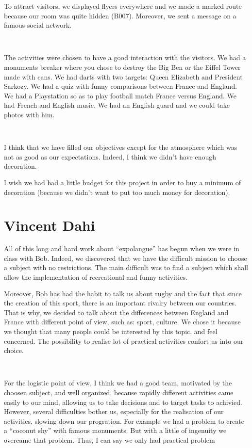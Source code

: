 \documentclass[11pt;a4paper]{report}
\begin{document}
To attract visitors, we displayed flyers everywhere and we made a marked route because our room was quite hidden (B007). Moreover, we sent a message on a famous social network.

~

The activities were chosen to have a good interaction with the visitors. We had a monuments breaker where you chose to destroy the Big Ben or the Eiffel Tower made with cans. We had darts with two targets: Queen Elizabeth and President Sarkozy. We had a quiz with funny comparisons between France and England. We had a Playstation so as to play football match France versus England. We had French and English music. We had an English guard and we could take photos with him. 

~

I think that we have filled our objectives except for the atmosphere which was not as good as our expectations. Indeed, I think we didn’t have enough decoration.

I wish we had had a little budget for this project in order to buy a minimum of decoration (because we didn’t want to put too much money for decoration). 


\newpage
  \section{Vincent Dahi}

    All of this long and hard work about “expolangue” has begun when we were in class with Bob. Indeed, we discovered that we have the difficult mission to choose a subject with no restrictions. The main difficult was to find a subject which shall allow the implementation of recreational and funny activities. 

Moreover, Bob has had the habit to talk us about rugby and the fact that since the creation of this sport, there is an important rivalry between our countries.
That is why, we decided to talk about the differences between England and France with different point of view, such as: sport, culture. We chose it because we thought that many people could be interested by this topic, and feel concerned. The possibility to realise lot of practical activities confort us into our choice.             

~

For the logistic point of view, I think we had a good team, motivated by the choosen subject, and well organized, because rapidly different activities came easily to our mind, allowing us to take decisions and to target tasks to achivied.
However, several difficulties bother us, especially for the realisation of our activities, slowing down our progration. For example we had a problem to create a “coconut shy” with famous monuments. But with a little of ingenuity we overcame that problem.
Thus, I can say we only had practical problem 
\end{document}
